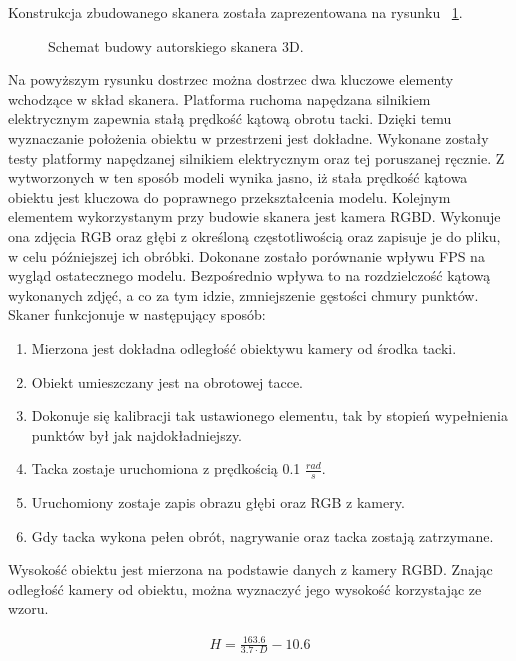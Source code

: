 Konstrukcja zbudowanego skanera została zaprezentowana na rysunku ~\ref{fig:konstrukcjaModelu}. 
\begin{figure}[H]
  \centering
    

  \caption{Schemat budowy autorskiego skanera 3D.}   
  \label{fig:konstrukcjaModelu}
\end{figure}
Na powyższym rysunku dostrzec można dostrzec dwa kluczowe elementy wchodzące w skład skanera. Platforma ruchoma napędzana silnikiem elektrycznym zapewnia stałą prędkość kątową obrotu tacki. Dzięki temu wyznaczanie położenia obiektu w przestrzeni jest dokładne. Wykonane zostały testy platformy napędzanej silnikiem elektrycznym oraz tej poruszanej ręcznie. Z wytworzonych w ten sposób modeli wynika jasno, iż stała prędkość kątowa obiektu jest kluczowa do poprawnego przekształcenia modelu. Kolejnym elementem wykorzystanym przy budowie skanera jest kamera RGBD. Wykonuje ona zdjęcia RGB oraz głębi z określoną częstotliwością oraz zapisuje je do pliku, w celu późniejszej ich obróbki. Dokonane zostało porównanie wpływu FPS na wygląd ostatecznego modelu. Bezpośrednio wpływa to na rozdzielczość kątową wykonanych zdjęć, a co za tym idzie, zmniejszenie gęstości chmury punktów.\\
Skaner funkcjonuje w następujący sposób:
\begin{enumerate}
    \item Mierzona jest dokładna odległość obiektywu kamery od środka tacki.
    \item Obiekt umieszczany jest na obrotowej tacce.
    \item Dokonuje się kalibracji tak ustawionego elementu, tak by stopień wypełnienia punktów był jak najdokładniejszy.
    \item Tacka zostaje uruchomiona z prędkością 0.1 $\frac{rad}{s}$.
    \item Uruchomiony zostaje zapis obrazu głębi oraz RGB z kamery.
    \item Gdy tacka wykona pełen obrót, nagrywanie oraz tacka zostają zatrzymane.
\end{enumerate}

Wysokość obiektu jest mierzona na podstawie danych z kamery RGBD. Znając odległość kamery od obiektu, można wyznaczyć jego wysokość korzystając ze wzoru.

\begin{equation}
    \begin{aligned}
        H=\frac{163.6}{3.7 \cdot D} -10.6
    \end{aligned}
\end{equation}

